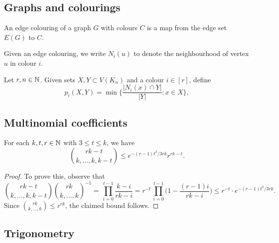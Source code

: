 \subsection{Graphs and colourings}

\begin{definition}
  \label{def:edge-colouring}
  \leanok
  An edge colouring of a graph $G$ with colours $C$ is a map from the edge set $E(G)$ to $C$.
\end{definition}

\begin{definition}
  \label{def:colour-neighborhood}
  \leanok
  Given an edge colouring, we write $N_i(u)$ to denote the neighbourhood of vertex $u$ in colour $i$.
\end{definition}

\begin{definition}
  \label{def:p}
  Let $r, n\in\mathbb{N}$. Given sets $X,Y \subset V(K_n)$ and a colour $i \in [r]$, define
  $$p_i(X,Y) = \min\bigg\{ \frac{|N_i(x) \cap Y|}{|Y|} : x \in X \bigg\},$$
\end{definition}


\subsection{Multinomial coefficients}

\begin{lemma}  
  \label{lem:multibounds}
  For each $k,t,r \in \mathbb{N}$ with $3 \le t \le k$, we have
  $$\binom{rk-t}{k,\dots,k,k-t} \le e^{-(r-1)t^2/3rk} r^{rk-t}.$$
\end{lemma}
  
\begin{proof}
  To prove this, observe that 
  $$\binom{rk-t}{k,\dots,k,k-t} \binom{rk}{k,\dots,k}^{-1} = \, \prod_{i = 0}^{t - 1} \frac{k - i}{rk - i} = r^{-t} \,\prod_{i = 0}^{t-1} \bigg( 1 - \frac{(r-1)i}{rk - i} \bigg) \le r^{-t} \cdot e^{-(r-1)t^2/3rk}.$$
  Since $\binom{rk}{k,\dots,k} \le r^{rk}$, the claimed bound follows.
\end{proof}


\subsection{Trigonometry}

